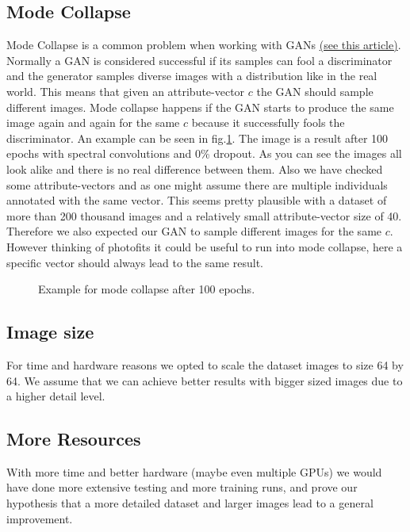 \documentclass[12pt, a4paper]{article}
\begin{document}
\subsection{Mode Collapse}
Mode Collapse is a common problem when working with GANs \href{https://machinelearning.wtf/terms/mode-collapse/}{(see this article)}. 
Normally a GAN is considered successful if its samples can fool a discriminator and the generator samples diverse images with a distribution like in the real world. 
This means that given an attribute-vector $c$ the GAN should sample different images. Mode collapse happens if the GAN starts to produce the same image again and again for the same $c$
because it successfully fools the discriminator. An example can be seen in fig.\ref{fig:modecollapse}.
The image is a result after 100 epochs with spectral convolutions and 0\% dropout. As you can see the images all look alike and there is no real difference between them. Also we have checked some attribute-vectors 
and as one might assume there are multiple individuals annotated with the same vector. This seems pretty plausible with a dataset of more than 200 thousand images and a relatively small attribute-vector size of 40. Therefore 
we also expected our GAN to sample different images for the same $c$. However thinking of photofits it could be useful to run into mode collapse, here a specific vector should always lead to the same result.
\begin{figure}
    \caption{Example for mode collapse after 100 epochs.}
    \label{fig:modecollapse}
\end{figure}
\subsection{Image size}
For time and hardware reasons we opted to scale the dataset images to size 64 by 64. We assume that we can achieve better results with bigger sized images due to a higher detail level.

\subsection{More Resources}
With more time and better hardware (maybe even multiple GPUs) we would have done more extensive testing and more training runs, and prove our hypothesis that a more detailed dataset and larger images lead to a general improvement.
\end{document}
